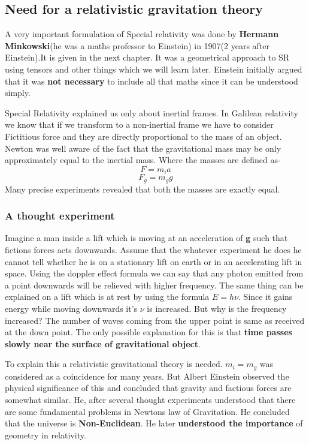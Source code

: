 \documentclass[12pt,a4paper]{article}
\numberwithin{table}{section}
\numberwithin{figure}{section}
\numberwithin{equation}{section}
\theoremstyle{remark}
\theoremstyle{definition}
\begin{document}
\subsection{Need for a relativistic gravitation theory}
A very important formulation of Special relativity was done by \textbf{Hermann Minkowski}(he was a maths professor to Einstein) in 1907(2 years after Einstein).It is given in the next chapter. It was a geometrical approach to SR using tensors and other things which we will learn later. Einstein initially argued that it was \textbf{not necessary} to include all that maths since it can be understood simply.

Special Relativity explained us only about inertial frames. In Galilean relativity we know that if we transform to a non-inertial frame we have to consider Fictitious force and they are directly proportional to the mass of an object. Newton was well aware of the fact that the gravitational mass may be only approximately equal to the inertial mass. Where the masses are defined as-
$$F=m_i a $$
$$F_g=m_g g $$
Many precise experiments revealed that both the masses are exactly equal. 

\subsubsection*{A thought experiment}

Imagine a man inside a lift which is moving at an acceleration of \textbf{g} such that fictions forces acts downwards. Assume that the whatever experiment he does he cannot tell whether he is on a stationary lift on earth or in an accelerating lift in space. Using the doppler effect formula we can say that any photon emitted from a point downwards will be relieved with higher frequency. The same thing can be explained on a lift which is at rest by using the formula $E=h\nu$. Since it gains energy while moving downwards it's $\nu$ is increased. But why is the frequency increased? The number of waves coming from the upper point is same as received at the down point. The only possible explanation for this is that \textbf{time passes slowly near the surface of gravitational object}.

To explain this a relativistic gravitational theory is needed. $m_i=m_g$ was considered as a coincidence for many years. But Albert Einstein observed the physical significance of this and concluded that gravity and factious forces are somewhat similar. He, after several thought experiments understood that there are some fundamental problems in Newtons law of Gravitation. He concluded that the universe is \textbf{Non-Euclidean}. He later \textbf{understood the importance} of geometry in relativity.
\end{document}
